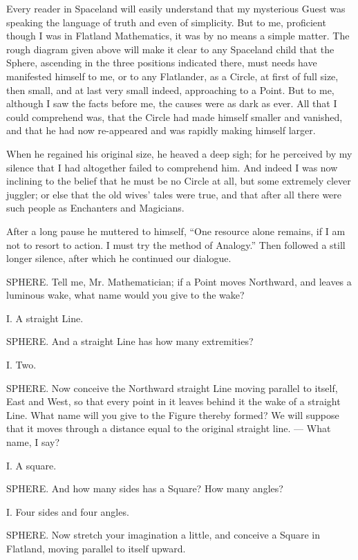 \documentclass[12pt, a4paper, oneside]{memoir}
\begin{document}
Every reader in Spaceland will easily understand that my mysterious Guest was
speaking the language of truth and even of simplicity. But to me, proficient
though I was in Flatland Mathematics, it was by no means a simple matter. The
rough diagram given above will make it clear to any Spaceland child that the
Sphere, ascending in the three positions indicated there, must needs have
manifested himself to me, or to any Flatlander, as a Circle, at first of full
size, then small, and at last very small indeed, approaching to a Point. But
to me, although I saw the facts before me, the causes were as dark as ever.
All that I could comprehend was, that the Circle had made himself smaller and
vanished, and that he had now re-appeared and was rapidly making himself
larger.

When he regained his original size, he heaved a deep sigh; for he perceived by
my silence that I had altogether failed to comprehend him. And indeed I was
now inclining to the belief that he must be no Circle at all, but some
extremely clever juggler; or else that the old wives' tales were true, and
that after all there were such people as Enchanters and Magicians.

After a long pause he muttered to himself, ``One resource alone remains, if I
am not to resort to action. I must try the method of Analogy.'' Then followed a
still longer silence, after which he continued our dialogue.

SPHERE. Tell me, Mr. Mathematician; if a Point moves Northward, and leaves a
luminous wake, what name would you give to the wake?

I. A straight Line.

SPHERE. And a straight Line has how many extremities?

I. Two.

SPHERE. Now conceive the Northward straight Line moving parallel to itself,
East and West, so that every point in it leaves behind it the wake of a
straight Line. What name will you give to the Figure thereby formed? We will
suppose that it moves through a distance equal to the original straight line.
--- What name, I say?

I. A square.

SPHERE. And how many sides has a Square? How many angles?

I. Four sides and four angles.

SPHERE. Now stretch your imagination a little, and conceive a Square in
Flatland, moving parallel to itself upward.
\end{document}
